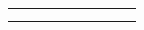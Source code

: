 \begin{tabular}{|*{7}{@{}c@{}|}l|}
     \xx{ }{ }{ }{ }{ }\xy{ }{ }{ }{ }{ }{ } &   %
     \xx{ }{ }{ }{ }{ }\xy{ }{ }{ }{ }{ }{ } &   %
     \xx{ }{ }{ }{ }{ }\xy{ }{ }{ }{ }{ }{ } &   %
     \xx{ }{ }{ }{ }{ }\xy{ }{ }{ }{ }{ }{ } &&  %
     \xx{ }{ }{ }{ }{ }\xy{ }{ }{ }{ }{ }{ } &   %
     \xx{ }{ }{ }{ }{ }\xy{ }{ }{ }{ }{ }{ } &   %
\\ %
     \xx{ }{ }{ }{ }{ }\xy{ }{ }{ }{ }{ }{ } &   %
     \xx{ }{ }{ }{ }{ }\xy{ }{ }{ }{ }{ }{ } &   %
     \xx{ }{ }{ }{ }{ }\xy{ }{ }{ }{ }{ }{ } &   %
     \xx{ }{ }{ }{ }{ }\xy{ }{ }{ }{ }{ }{ } &&  %
     \xx{ }{ }{ }{ }{ }\xy{ }{ }{ }{ }{ }{ } &   %
     \xx{ }{ }{ }{ }{ }\xy{ }{ }{ }{ }{ }{ } &   %
\\ \hline \end{tabular}
